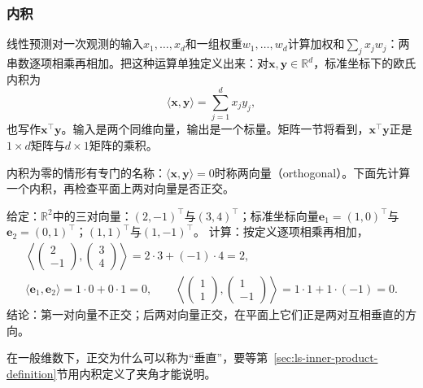 \subsubsection{内积}
\label{sec:ls-inner-products}
\label{sec:prelim-vector-inner-length}

线性预测对一次观测的输入$x_1,\ldots,x_d$和一组权重$w_1,\ldots,w_d$计算加权和$\sum_jx_jw_j$：两串数逐项相乘再相加。把这种运算单独定义出来：对$\bm x,\bm y\in\mathbb R^d$，标准坐标下的欧氏内积为
\[
 \langle\bm x,\bm y\rangle
 =\sum_{j=1}^d x_jy_j,
\]
也写作$\bm x^\top\bm y$。输入是两个同维向量，输出是一个标量。矩阵一节将看到，$\bm x^\top\bm y$正是$1\times d$矩阵与$d\times1$矩阵的乘积。

内积为零的情形有专门的名称：$\langle\bm x,\bm y\rangle=0$时称两向量（orthogonal）。下面先计算一个内积，再检查平面上两对向量是否正交。
\begin{example}[内积与正交的计算]
\label{ex:ls-inner-product-orthogonality}
给定：$\mathbb R^2$中的三对向量：$(2,-1)^\top$与$(3,4)^\top$；标准坐标向量$\bm e_1=(1,0)^\top$与$\bm e_2=(0,1)^\top$；$(1,1)^\top$与$(1,-1)^\top$。
计算：按定义逐项相乘再相加，
\[
 \begin{gathered}
 \left\langle\begin{pmatrix}2\\-1\end{pmatrix},\begin{pmatrix}3\\4\end{pmatrix}\right\rangle=2\cdot3+(-1)\cdot4=2,\\
 \langle\bm e_1,\bm e_2\rangle=1\cdot0+0\cdot1=0,\qquad
 \left\langle\begin{pmatrix}1\\1\end{pmatrix},\begin{pmatrix}1\\-1\end{pmatrix}\right\rangle=1\cdot1+1\cdot(-1)=0.
 \end{gathered}
\]
结论：第一对向量不正交；后两对向量正交，在平面上它们正是两对互相垂直的方向。
\end{example}
在一般维数下，正交为什么可以称为“垂直”，要等第~\ref{sec:ls-inner-product-definition}节用内积定义了夹角才能说明。


